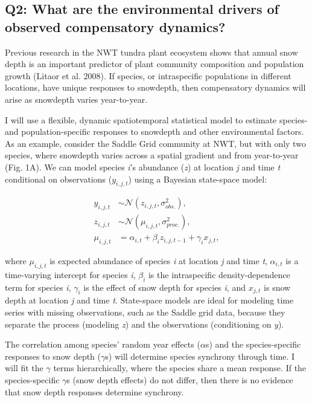 \documentclass[12pt,]{article}
\begin{document}
\subsection{Q2: What are the environmental drivers of observed compensatory dynamics?}

Previous research in the NWT tundra plant ecosystem shows that annual
snow depth is an important predictor of plant community composition and
population growth (Litaor et al. 2008). If species, or intraspecific
populations in different locations, have unique responses to snowdepth,
then compensatory dynamics will arise as snowdepth varies year-to-year.

I will use a flexible, dynamic spatiotemporal statistical model to
estimate species- and population-specific responses to snowdepth and
other environmental factors. As an example, consider the Saddle Grid
community at NWT, but with only two species, where snowdepth varies
across a spatial gradient and from year-to-year (Fig. 1A). We can model
species \emph{i}'s abundance (\emph{z}) at location \emph{j} and time
\emph{t} conditional on observations (\(y_{i,j,t}\)) using a Bayesian
state-space model: \vspace{-2em}

\begin{align}
y_{i,j,t} &\sim \mathcal{N}(z_{i,j,t}, \sigma_{obs.}^2), \\ 
z_{i,j,t} &\sim \mathcal{N}(\mu_{i,j,t}, \sigma_{proc.}^2), \\
\mu_{i,j,t} &= \alpha_{i,t} + \beta_{i}z_{i,j,t-1} + \gamma_{i}x_{j,t},
\end{align}\vspace{-2em}

\noindent{}where \(\mu_{i,j,t}\) is expected abundance of species
\emph{i} at location \emph{j} and time \emph{t}, \(\alpha_{i,t}\) is a
time-varying intercept for species \emph{i}, \(\beta_{i}\) is the
intraspecific density-dependence term for species \emph{i},
\(\gamma_{i}\) is the effect of snow depth for species \emph{i}, and
\(x_{j,t}\) is snow depth at location \emph{j} and time \emph{t}.
State-space models are ideal for modeling time series with missing
observations, such as the Saddle grid data, because they separate the
process (modeling \emph{z}) and the observations (conditioning on
\emph{y}).

The correlation among species' random year effects (\(\alpha\)s) and the
species-specific responses to snow depth (\(\gamma\)s) will determine
species synchrony through time. I will fit the \(\gamma\) terms
hierarchically, where the species share a mean response. If the
species-specific \(\gamma\)s (snow depth effects) do not differ, then
there is no evidence that snow depth responses determine synchrony.
\end{document}
